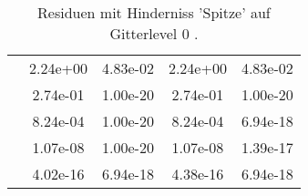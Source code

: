 \begin{table}
\begin{tabular}{c|cc|cc|}
\multicolumn{1}{|c|}{} & \multicolumn{1}{|c|}{  2.24e+00} & \multicolumn{1}{|c|}{  4.83e-02} & \multicolumn{1}{|c|}{  2.24e+00} & \multicolumn{1}{|c|}{  4.83e-02} \\ 
\multicolumn{1}{|c|}{} & \multicolumn{1}{|c|}{  2.74e-01} & \multicolumn{1}{|c|}{  1.00e-20} & \multicolumn{1}{|c|}{  2.74e-01} & \multicolumn{1}{|c|}{  1.00e-20} \\ 
\multicolumn{1}{|c|}{} & \multicolumn{1}{|c|}{  8.24e-04} & \multicolumn{1}{|c|}{  1.00e-20} & \multicolumn{1}{|c|}{  8.24e-04} & \multicolumn{1}{|c|}{  6.94e-18} \\ 
\multicolumn{1}{|c|}{} & \multicolumn{1}{|c|}{  1.07e-08} & \multicolumn{1}{|c|}{  1.00e-20} & \multicolumn{1}{|c|}{  1.07e-08} & \multicolumn{1}{|c|}{  1.39e-17} \\ 
\multicolumn{1}{|c|}{} & \multicolumn{1}{|c|}{  4.02e-16} & \multicolumn{1}{|c|}{  6.94e-18} & \multicolumn{1}{|c|}{  4.38e-16} & \multicolumn{1}{|c|}{  6.94e-18} \\ 
\hline 
\end{tabular}\caption{Residuen mit Hinderniss 'Spitze' auf Gitterlevel 0 .}\label{tab:Residuum_Spitze_level0}
\end{table} 
